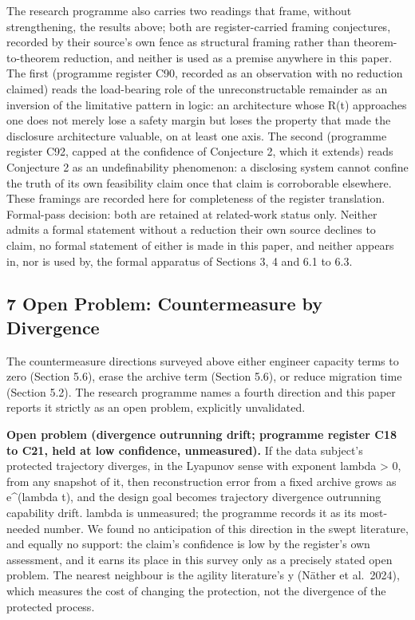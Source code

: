 \documentclass[
]{llncs}
\begin{document}
The research programme also carries two readings that frame, without
strengthening, the results above; both are register-carried framing
conjectures, recorded by their source's own fence as structural framing
rather than theorem-to-theorem reduction, and neither is used as a
premise anywhere in this paper. The first (programme register C90,
recorded as an observation with no reduction claimed) reads the
load-bearing role of the unreconstructable remainder as an inversion of
the limitative pattern in logic: an architecture whose R(t) approaches
one does not merely lose a safety margin but loses the property that
made the disclosure architecture valuable, on at least one axis. The
second (programme register C92, capped at the confidence of Conjecture
2, which it extends) reads Conjecture 2 as an undefinability phenomenon:
a disclosing system cannot confine the truth of its own feasibility
claim once that claim is corroborable elsewhere. These framings are
recorded here for completeness of the register translation. Formal-pass
decision: both are retained at related-work status only. Neither admits
a formal statement without a reduction their own source declines to
claim, no formal statement of either is made in this paper, and neither
appears in, nor is used by, the formal apparatus of Sections 3, 4 and
6.1 to 6.3.

\subsection{7 Open Problem: Countermeasure by
Divergence}\label{open-problem-countermeasure-by-divergence}

The countermeasure directions surveyed above either engineer capacity
terms to zero (Section 5.6), erase the archive term (Section 5.6), or
reduce migration time (Section 5.2). The research programme names a
fourth direction and this paper reports it strictly as an open problem,
explicitly unvalidated.

\textbf{Open problem (divergence outrunning drift; programme register
C18 to C21, held at low confidence, unmeasured).} If the data subject's
protected trajectory diverges, in the Lyapunov sense with exponent
lambda \textgreater{} 0, from any snapshot of it, then reconstruction
error from a fixed archive grows as e\^{}(lambda t), and the design goal
becomes trajectory divergence outrunning capability drift. lambda is
unmeasured; the programme records it as its most-needed number. We found
no anticipation of this direction in the swept literature, and equally
no support: the claim's confidence is low by the register's own
assessment, and it earns its place in this survey only as a precisely
stated open problem. The nearest neighbour is the agility literature's y
(Näther et al.~2024), which measures the cost of changing the
protection, not the divergence of the protected process.
\end{document}
